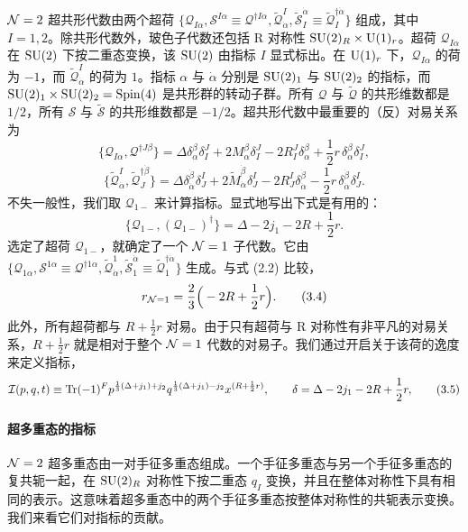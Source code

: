 $\mathcal{N}=2$ 超共形代数由两个超荷
$\{\mathcal{Q}_{I\alpha},\mathcal{S}^{I\alpha}\equiv\mathcal{Q}^{\dagger I\alpha},\tilde{\mathcal{Q}}^I_{\dot\alpha},\tilde{\mathcal{S}}^{\dot\alpha}_I\equiv\tilde{\mathcal{Q}}^{\dagger\dot\alpha}_I\}$
组成，其中 $I=1,2$。除共形代数外，玻色子代数还包括 R 对称性 $\operatorname{SU}(2)_R\times\operatorname{U}(1)_r$。超荷 $\mathcal{Q}_{I\alpha}$ 在 $\operatorname{SU}(2)$ 下按二重态变换，该 $\operatorname{SU}(2)$ 由指标 $I$ 显式标出。在 $\operatorname{U}(1)_r$ 下，$\mathcal{Q}_{I\alpha}$ 的荷为 $-1$，而 $\tilde{\mathcal{Q}}^I_{\dot\alpha}$ 的荷为 $1$。指标 $\alpha$ 与 $\dot\alpha$ 分别是 $\operatorname{SU}(2)_1$ 与 $\operatorname{SU}(2)_2$ 的指标，而 $\operatorname{SU}(2)_1\times\operatorname{SU}(2)_2=\mathrm{Spin}(4)$ 是共形群的转动子群。所有 $\mathcal{Q}$ 与 $\tilde{\mathcal{Q}}$ 的共形维数都是 $1/2$，所有 $\mathcal{S}$ 与 $\tilde{\mathcal{S}}$ 的共形维数都是 $-1/2$。超共形代数中最重要的（反）对易关系为
\[
\{\mathcal{Q}_{I\alpha},\mathcal{Q}^{\dagger J\beta}\}
=\Delta\delta_\alpha^\beta\delta_I^J+2M_\alpha^\beta\delta_I^J-2R_I^J\delta_\alpha^\beta+\frac12 r\,\delta_\alpha^\beta\delta_I^J ,
\tag{3.1}
\]
\[
\{\tilde{\mathcal{Q}}^I_{\dot\alpha},\tilde{\mathcal{Q}}^{\dagger\dot\beta}_J\}
=\Delta\delta_{\dot\alpha}^{\dot\beta}\delta_J^I+2\tilde M_{\dot\alpha}^{\dot\beta}\delta_J^I-2R_J^I\delta_{\dot\alpha}^{\dot\beta}-\frac12 r\,\delta_{\dot\alpha}^{\dot\beta}\delta_J^I .
\tag{3.2}
\]
不失一般性，我们取 $\mathcal{Q}_{1-}$ 来计算指标。显式地写出下式是有用的：
\[
\{\mathcal{Q}_{1-},(\mathcal{Q}_{1-})^\dagger\}=\Delta-2j_1-2R+\frac12 r .
\tag{3.3}
\]
选定了超荷 $\mathcal{Q}_{1-}$，就确定了一个 $\mathcal{N}=1$ 子代数。它由
$\{\mathcal{Q}_{1\alpha},\mathcal{S}^{1\alpha}\equiv\mathcal{Q}^{\dagger1\alpha},\tilde{\mathcal{Q}}^1_{\dot\alpha},\tilde{\mathcal{S}}^{\dot\alpha}_1\equiv\tilde{\mathcal{Q}}^{\dagger\dot\alpha}_1\}$
生成。与式 (2.2) 比较，
\[
r_{\mathcal{N}=1}=\frac23\Big(-2R+\frac12 r\Big) .
\tag{3.4}
\]
此外，所有超荷都与 $R+\frac12 r$ 对易。由于只有超荷与 R 对称性有非平凡的对易关系，$R+\frac12 r$ 就是相对于整个 $\mathcal{N}=1$ 代数的对易子。我们通过开启关于该荷的逸度来定义指标，
\[
\mathcal{I}(p,q,t)\equiv\operatorname{Tr}(-1)^F p^{\frac13(\Delta+j_1)+j_2}q^{\frac13(\Delta+j_1)-j_2}x^{(R+\frac12 r)},\qquad
\delta=\Delta-2j_1-2R+\frac12 r ,
\tag{3.5}
\]
\paragraph{超多重态的指标} $\mathcal{N}=2$ 超多重态由一对手征多重态组成。一个手征多重态与另一个手征多重态的复共轭一起，在 $\operatorname{SU}(2)_R$ 对称性下按二重态 $q_I$ 变换，并且在整体对称性下具有相同的表示。这意味着超多重态中的两个手征多重态按整体对称性的共轭表示变换。我们来看它们对指标的贡献。


